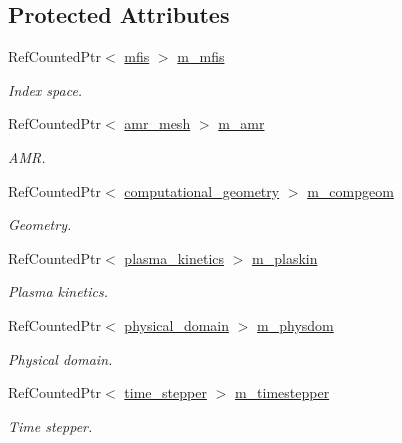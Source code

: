 \subsection*{Protected Attributes}
\begin{DoxyCompactItemize}
\item 
Ref\+Counted\+Ptr$<$ \hyperlink{classmfis}{mfis} $>$ \hyperlink{classplasma__engine_a585df123a78ab10b23c68209f2d36e7d}{m\+\_\+mfis}
\begin{DoxyCompactList}\small\item\em Index space. \end{DoxyCompactList}\item 
Ref\+Counted\+Ptr$<$ \hyperlink{classamr__mesh}{amr\+\_\+mesh} $>$ \hyperlink{classplasma__engine_a3d5c4695671cd62e79500a40572d14e2}{m\+\_\+amr}
\begin{DoxyCompactList}\small\item\em A\+MR. \end{DoxyCompactList}\item 
Ref\+Counted\+Ptr$<$ \hyperlink{classcomputational__geometry}{computational\+\_\+geometry} $>$ \hyperlink{classplasma__engine_a40573f0fdf8bba99f48842dbf8ccefc8}{m\+\_\+compgeom}
\begin{DoxyCompactList}\small\item\em Geometry. \end{DoxyCompactList}\item 
Ref\+Counted\+Ptr$<$ \hyperlink{classplasma__kinetics}{plasma\+\_\+kinetics} $>$ \hyperlink{classplasma__engine_ab5ad9d483a1b69f5cc7640fd0ad6bdd2}{m\+\_\+plaskin}
\begin{DoxyCompactList}\small\item\em Plasma kinetics. \end{DoxyCompactList}\item 
Ref\+Counted\+Ptr$<$ \hyperlink{classphysical__domain}{physical\+\_\+domain} $>$ \hyperlink{classplasma__engine_a9a74dc0c212ba3df4eca3bf3e86692bb}{m\+\_\+physdom}
\begin{DoxyCompactList}\small\item\em Physical domain. \end{DoxyCompactList}\item 
Ref\+Counted\+Ptr$<$ \hyperlink{classtime__stepper}{time\+\_\+stepper} $>$ \hyperlink{classplasma__engine_a1ddf5178d9bd09d9844e0c8c7486e9b3}{m\+\_\+timestepper}
\begin{DoxyCompactList}\small\item\em Time stepper. \end{DoxyCompactList}\item 

\end{DoxyCompactItemize}
